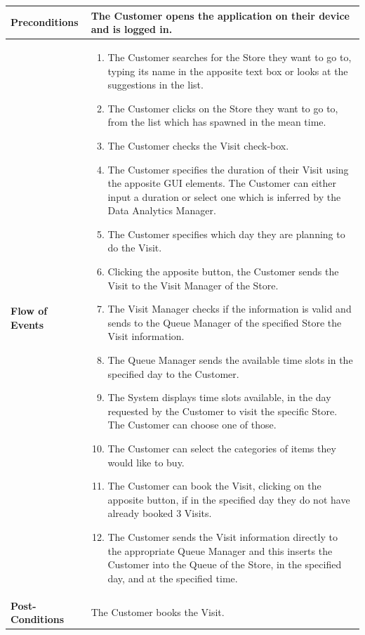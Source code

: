 \documentclass[a4paper, 12pt, oneside]{article}
\begin{document}
\begin{enumerate}[labelindent=20pt, label={UC.\arabic*}, itemindent=1em,leftmargin=!]
\begin{tabularx}{\linewidth}{| l | X |}
	\hline
	\textbf{Preconditions} & The Customer opens the application on their device and is logged in.\\
	
	\hline
	\textbf{Flow of Events} & \parbox{0.7\textwidth}{	
		\begin{enumerate}
			\item The Customer searches for the Store they want to go to, typing its name in the apposite text box or looks at the suggestions in the list.
			\item The Customer clicks on the Store they want to go to, from the list which has spawned in the mean time.
			\item The Customer checks the Visit check-box.
			\item The Customer specifies the duration of their Visit using the apposite GUI elements. The Customer can either input a duration or select one which is inferred by the Data Analytics Manager.
			\item The Customer specifies which day they are planning to do the Visit.
			\item Clicking the apposite button, the Customer sends the Visit to the Visit Manager of the Store.
			\item The Visit Manager checks if the information is valid and sends to the Queue Manager of the specified Store the Visit information.
			\item The Queue Manager sends the available time slots in the specified day to the Customer.
			\item The System displays time slots available, in the day requested by the Customer to visit the specific Store. The Customer can choose one of those.
			\item The Customer can select the categories of items they would like to buy.
			\item The Customer can book the Visit, clicking on the apposite button, if in the specified day they do not have already booked 3 Visits.
			\item The Customer sends the Visit information directly to the appropriate Queue Manager and this inserts the Customer into the Queue of the Store, in the specified day, and at the specified time.
	\end{enumerate}}\\
	
	\hline
	\textbf{Post-Conditions} & The Customer books the Visit.\\
	

\end{tabularx}
\end{enumerate}
\end{document}
